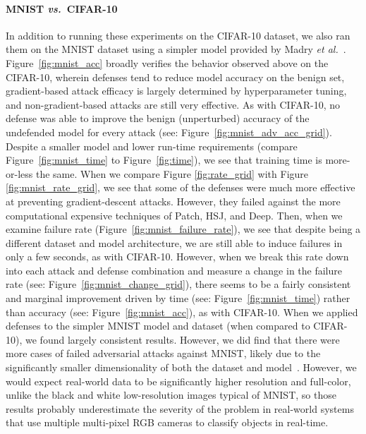 \documentclass[lettersize,journal]{IEEEtran}
\begin{document}
\paragraph{MNIST \textit{vs.}~CIFAR-10}
In addition to running these experiments on the CIFAR-10 dataset, we also ran them on the MNIST dataset using a simpler model provided by Madry \textit{et al.}~\cite{madry2017towards}. Figure~\ref{fig:mnist_acc} broadly verifies the behavior observed above on the CIFAR-10, wherein defenses tend to reduce model accuracy on the benign set, gradient-based attack efficacy is largely determined by hyperparameter tuning, and non-gradient-based attacks are still very effective. As with CIFAR-10, no defense was able to improve the benign (unperturbed) accuracy of the undefended model for every attack (see: Figure~\ref{fig:mnist_adv_acc_grid}). Despite a smaller model and lower run-time requirements (compare Figure~\ref{fig:mnist_time} to Figure~\ref{fig:time}), we see that training time is more-or-less the same. When we compare Figure \ref{fig:rate_grid} with Figure \ref{fig:mnist_rate_grid}, we see that some of the defenses were much more effective at preventing gradient-descent attacks. However, they failed against the more computational expensive techniques of Patch, HSJ, and Deep. Then, when we examine failure rate (Figure~\ref{fig:mnist_failure_rate}), we see that despite being a different dataset and model architecture, we are still able to induce failures in only a few seconds, as with CIFAR-10. However, when we break this rate down into each attack and defense combination and measure a change in the failure rate (see: Figure~\ref{fig:mnist_change_grid}), there seems to be a fairly consistent and marginal improvement driven by time (see: Figure~\ref{fig:mnist_time}) rather than accuracy (see:  Figure~\ref{fig:mnist_acc}), as with CIFAR-10. When we applied defenses to the simpler MNIST model and dataset (when compared to CIFAR-10), we found largely consistent results. However, we did find that there were more cases of failed adversarial attacks against MNIST, likely due to the significantly smaller dimensionality of both the dataset and model~\cite{dohmatob_generalized_2019}. However, we would expect real-world data to be significantly higher resolution and full-color, unlike the black and white low-resolution images typical of MNIST, so those results probably underestimate the severity of the problem in real-world systems that use multiple multi-pixel RGB cameras to classify objects in real-time. 
 
\end{document}
